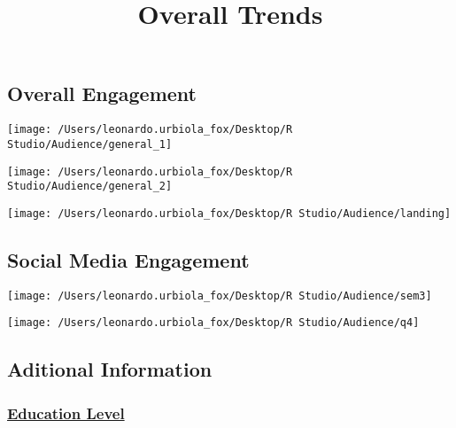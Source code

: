 \documentclass[
]{article}
\title{Overall Trends}
\author{}
\date{\vspace{-2.5em}}
\begin{document}
\maketitle

\hypertarget{overall-engagement}{%
\subsection{Overall Engagement}\label{overall-engagement}}

\begin{center}\texttt{[image: /Users/leonardo.urbiola\_fox/Desktop/R Studio/Audience/general\_1]} \end{center}

\begin{center}\texttt{[image: /Users/leonardo.urbiola\_fox/Desktop/R Studio/Audience/general\_2]} \end{center}

\begin{center}\texttt{[image: /Users/leonardo.urbiola\_fox/Desktop/R Studio/Audience/landing]} \end{center}

\hypertarget{social-media-engagement}{%
\subsection{Social Media Engagement}\label{social-media-engagement}}

\begin{center}\texttt{[image: /Users/leonardo.urbiola\_fox/Desktop/R Studio/Audience/sem3]} \end{center}

\begin{center}\texttt{[image: /Users/leonardo.urbiola\_fox/Desktop/R Studio/Audience/q4]} \end{center}

\hypertarget{aditional-information}{%
\subsection{Aditional Information}\label{aditional-information}}

\hypertarget{education-level}{%
\subsubsection{\texorpdfstring{\href{https://www.census.gov/newsroom/press-releases/2022/educational-attainment.html\#:~:text=1\%20In\%202021\%2C\%2029.4\%25\%20of\%20men\%20age\%2025,more\%2C\%2053.1\%25\%20were\%20women\%20and\%2046.9\%25\%20were\%20men./}{Education
Level}}{Education Level}}\label{education-level}}
\end{document}
